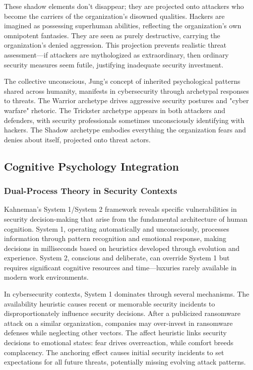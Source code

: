 \documentclass[manuscript,screen,review]{acmart}
\begin{document}
These shadow elements don't disappear; they are projected onto attackers who become the carriers of the organization's disowned qualities. Hackers are imagined as possessing superhuman abilities, reflecting the organization's own omnipotent fantasies. They are seen as purely destructive, carrying the organization's denied aggression. This projection prevents realistic threat assessment—if attackers are mythologized as extraordinary, then ordinary security measures seem futile, justifying inadequate security investment.

The collective unconscious, Jung's concept of inherited psychological patterns shared across humanity, manifests in cybersecurity through archetypal responses to threats. The Warrior archetype drives aggressive security postures and "cyber warfare" rhetoric. The Trickster archetype appears in both attackers and defenders, with security professionals sometimes unconsciously identifying with hackers. The Shadow archetype embodies everything the organization fears and denies about itself, projected onto threat actors.

\subsection{Cognitive Psychology Integration}

\subsubsection{Dual-Process Theory in Security Contexts}

Kahneman's System 1/System 2 framework\cite{kahneman2011} reveals specific vulnerabilities in security decision-making that arise from the fundamental architecture of human cognition. System 1, operating automatically and unconsciously, processes information through pattern recognition and emotional response, making decisions in milliseconds based on heuristics developed through evolution and experience. System 2, conscious and deliberate, can override System 1 but requires significant cognitive resources and time—luxuries rarely available in modern work environments.

In cybersecurity contexts, System 1 dominates through several mechanisms. The availability heuristic causes recent or memorable security incidents to disproportionately influence security decisions. After a publicized ransomware attack on a similar organization, companies may over-invest in ransomware defenses while neglecting other vectors. The affect heuristic links security decisions to emotional states: fear drives overreaction, while comfort breeds complacency. The anchoring effect causes initial security incidents to set expectations for all future threats, potentially missing evolving attack patterns.
\end{document}
